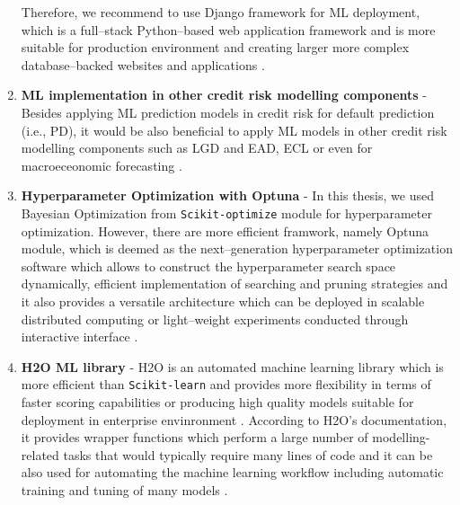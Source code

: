 \begin{enumerate}
    Therefore, we recommend to use Django framework for ML deployment, which is a full--stack Python--based web application framework and is more suitable for production environment and creating larger more complex database--backed websites and applications \citep{khatri2023}.
    \item \textbf{ML implementation in other credit risk modelling components} - Besides applying ML prediction models in credit risk for default prediction (i.e., PD), it would be also beneficial to apply ML models in other credit risk modelling components such as LGD and EAD, ECL \citep{munkhdalai2019empirical, grzybowska2020application} or even for macroeceonomic forecasting \citep{hall2018machine}.
    \item \textbf{Hyperparameter Optimization with Optuna} - In this thesis, we used Bayesian Optimization from \lstinline{Scikit-optimize} module for hyperparameter optimization. However, there are more efficient framwork, namely Optuna module, which is deemed as the next--generation hyperparameter optimization software which allows to construct the hyperparameter search space dynamically, efficient implementation of searching and pruning strategies and it also provides
    a versatile architecture which can be deployed in scalable distributed computing or light--weight experiments conducted through interactive interface \citep{akiba2019optuna}.
    \item \textbf{H2O ML library} - H2O is an automated machine learning library which is more efficient than \lstinline{Scikit-learn} and provides more flexibility in terms of faster scoring capabilities or producing high quality models suitable for deployment in enterprise envinronment \citep{ledell2020h2o}. 
    According to H2O's documentation, it provides wrapper functions which perform a large number of modelling-related tasks that would typically require many lines of code and it can be also used for automating the machine learning workflow including automatic training and tuning of many models \citep{H2Oai2023}.
\end{enumerate}